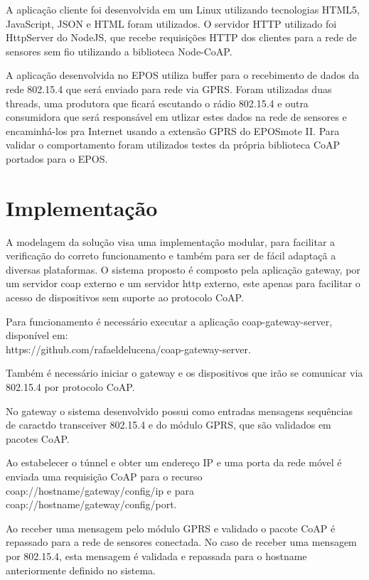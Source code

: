 A aplica\c{c}\~ao cliente foi desenvolvida em um Linux utilizando tecnologias HTML5, JavaScript, JSON e HTML foram utilizados. O servidor HTTP utilizado foi HttpServer do NodeJS, que recebe requisi\c{c}\~oes HTTP dos clientes para a rede de sensores sem fio utilizando a biblioteca Node-CoAP.

A aplica\c{c}\~ao desenvolvida no EPOS utiliza buffer para o recebimento de dados da rede 802.15.4 que ser\'a enviado para rede via GPRS. Foram utilizadas duas threads, uma produtora que ficar\'a escutando o r\'adio 802.15.4 e outra consumidora que ser\'a respons\'avel em utlizar estes dados na rede de sensores e encaminh\'a-los pra Internet usando a extens\~ao GPRS do EPOSmote II. Para validar o comportamento foram utilizados testes da pr\'opria biblioteca CoAP portados para o EPOS.

\section{Implementa\c{c}\~ao}

A modelagem da solu\c{c}\~ao visa uma implementa\c{c}\~ao modular, para facilitar a verifica\c{c}\~ao do correto funcionamento e tamb\'em para ser de f\'acil adapta\c{c}\~a a diversas plataformas. O sistema proposto \'e composto pela aplica\c{c}\~ao gateway, por um servidor coap externo e um servidor http externo, este apenas para facilitar o acesso de dispositivos sem suporte ao protocolo CoAP.

Para funcionamento \'e necess\'ario executar a aplica\c{c}\~ao coap-gateway-server, dispon\'ivel em:\\https://github.com/rafaeldelucena/coap-gateway-server.

Tamb\'em \'e necess\'ario iniciar o gateway e os dispositivos que ir\~ao se comunicar via 802.15.4 por protocolo CoAP.

No gateway o sistema desenvolvido possui como entradas mensagens sequ\^encias de caract\eres do transceiver 802.15.4 e do m\'odulo GPRS, que s\~ao validados em pacotes CoAP.

Ao estabelecer o t\'unnel e obter um endere\c{c}o IP e uma porta da rede m\'ovel \'e enviada uma requisi\c{c}\~ao CoAP para o recurso\\ coap://hostname/gateway/config/ip e para\\ coap://hostname/gateway/config/port.

Ao receber uma mensagem pelo m\'odulo GPRS e validado o pacote CoAP \'e repassado para a rede de sensores conectada.  No caso de receber uma mensagem por 802.15.4, esta mensagem \'e validada e repassada para o hostname anteriormente definido no sistema. 

